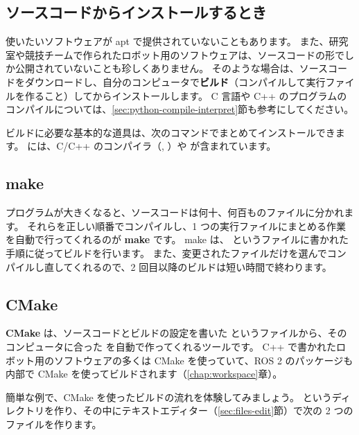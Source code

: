 \subsection{ソースコードからインストールするとき}

使いたいソフトウェアが apt で提供されていないこともあります。
また、研究室や競技チームで作られたロボット用のソフトウェアは、ソースコードの形でしか公開されていないことも珍しくありません。
そのような場合は、ソースコードをダウンロードし、自分のコンピュータで\textbf{ビルド}（コンパイルして実行ファイルを作ること）してからインストールします。
C 言語や C++ のプログラムのコンパイルについては、\ref{sec:python-compile-interpret}節も参考にしてください。

ビルドに必要な基本的な道具は、次のコマンドでまとめてインストールできます。
 には、C/C++ のコンパイラ（, ）や  が含まれています。


\subsection{make}

プログラムが大きくなると、ソースコードは何十、何百ものファイルに分かれます。
それらを正しい順番でコンパイルし、1 つの実行ファイルにまとめる作業を自動で行ってくれるのが \textbf{make} です。
make は、 というファイルに書かれた手順に従ってビルドを行います。
また、変更されたファイルだけを選んでコンパイルし直してくれるので、2 回目以降のビルドは短い時間で終わります。

\subsection{CMake}

\textbf{CMake} は、ソースコードとビルドの設定を書いた  というファイルから、そのコンピュータに合った  を自動で作ってくれるツールです。
C++ で書かれたロボット用のソフトウェアの多くは CMake を使っていて、ROS 2 のパッケージも内部で CMake を使ってビルドされます（\ref{chap:workspace}章）。

簡単な例で、CMake を使ったビルドの流れを体験してみましょう。
 というディレクトリを作り、その中にテキストエディター（\ref{sec:files-edit}節）で次の 2 つのファイルを作ります。

